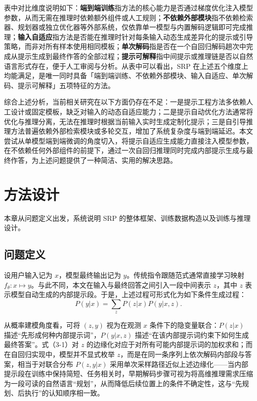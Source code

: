 表中对比维度说明如下：\textbf{端到端训练}指方法的核心能力是否通过梯度优化注入模型参数，从而无需在推理时依赖额外组件或人工规则；\textbf{不依赖外部模块}指不依赖检索器、规划器或独立优化器等外部系统，仅依靠单一模型与内置解码逻辑即可完成推理；\textbf{输入自适应}指方法是否能在推理时针对每条输入动态生成差异化的提示或引导策略，而非对所有样本使用相同模板；\textbf{单次解码}指是否在一个自回归解码趟次中完成从提示生成到最终作答的全部过程；\textbf{提示可解释}指中间提示或推理链是否以自然语言形式存在，便于人工审阅与分析。从表中可以看出，SRP 在上述五个维度上均能满足，是唯一同时具备「端到端训练、不依赖外部模块、输入自适应、单次解码、提示可解释」五项特征的方法。

综合上述分析，当前相关研究在以下方面仍存在不足：一是提示工程方法多依赖人工设计或固定模板，缺乏对输入的动态自适应能力；二是提示自动优化方法通常将优化与推理分离，无法在推理时根据当前输入实时生成定制化提示；三是自引导推理方法普遍依赖外部检索模块或多轮交互，增加了系统复杂度与端到端延迟。本文尝试从单模型端到端微调的角度切入，将提示自适应生成能力直接注入模型参数，在不依赖任何外部组件的前提下，通过一次自回归推理同时完成内部提示生成与最终作答，为上述问题提供了一种简洁、实用的解决思路。


\chapter[方法设计]{方法设计}

本章从问题定义出发，系统说明 SRP 的整体框架、训练数据构造以及训练与推理设计。

\section{问题定义}

设用户输入记为 $x$，模型最终输出记为 $y$。传统指令跟随范式通常直接学习映射 $f_{\theta}:x \mapsto y$。与此不同，本文在输入与最终回答之间引入一段中间表示 $z$，其中 $z$ 表示模型自动生成的内部提示段。于是，上述过程可形式化为如下条件生成过程：
\begin{equation}
P(y|x)=\sum_{z}P(z|x)P(y|x,z)\text{.}
\end{equation}

从概率建模角度看，可将 $(z,y)$ 视为在观测 $x$ 条件下的隐变量联合：$P(z|x)$ 描述“先形成何种内部提示词”，$P(y|x,z)$ 描述“在该内部提示词约束下如何生成最终答案”。式（3-1）对 $z$ 的边缘化对应于对所有可能内部提示词的加权求和；而在自回归实现中，模型并不显式枚举 $z$，而是在同一条序列上依次解码内部段与答案，相当于对联合分布 $P(z,y|x)$ 采用单次采样路径近似上述边缘化——当内部提示段在训练中保持简短、任务相关时，早期解码步骤可视为将高维推理需求压缩为一段可读的自然语言“规划”，从而降低后续位置上的条件不确定性，这与“先规划、后执行”的认知顺序相一致。

